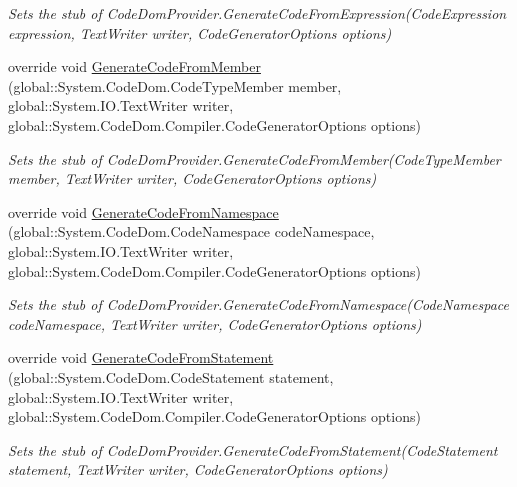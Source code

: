 \begin{DoxyCompactItemize}
\begin{DoxyCompactList}\small\item\em Sets the stub of Code\-Dom\-Provider.\-Generate\-Code\-From\-Expression(\-Code\-Expression expression, Text\-Writer writer, Code\-Generator\-Options options)\end{DoxyCompactList}\item 
override void \hyperlink{class_system_1_1_code_dom_1_1_compiler_1_1_fakes_1_1_stub_code_dom_provider_ac41ee4606fae68006bb1d25f86498d2d}{Generate\-Code\-From\-Member} (global\-::\-System.\-Code\-Dom.\-Code\-Type\-Member member, global\-::\-System.\-I\-O.\-Text\-Writer writer, global\-::\-System.\-Code\-Dom.\-Compiler.\-Code\-Generator\-Options options)
\begin{DoxyCompactList}\small\item\em Sets the stub of Code\-Dom\-Provider.\-Generate\-Code\-From\-Member(\-Code\-Type\-Member member, Text\-Writer writer, Code\-Generator\-Options options)\end{DoxyCompactList}\item 
override void \hyperlink{class_system_1_1_code_dom_1_1_compiler_1_1_fakes_1_1_stub_code_dom_provider_ab511d0b52d5c026428ede97513233b2f}{Generate\-Code\-From\-Namespace} (global\-::\-System.\-Code\-Dom.\-Code\-Namespace code\-Namespace, global\-::\-System.\-I\-O.\-Text\-Writer writer, global\-::\-System.\-Code\-Dom.\-Compiler.\-Code\-Generator\-Options options)
\begin{DoxyCompactList}\small\item\em Sets the stub of Code\-Dom\-Provider.\-Generate\-Code\-From\-Namespace(\-Code\-Namespace code\-Namespace, Text\-Writer writer, Code\-Generator\-Options options)\end{DoxyCompactList}\item 
override void \hyperlink{class_system_1_1_code_dom_1_1_compiler_1_1_fakes_1_1_stub_code_dom_provider_a2199bef6efabac7451b7909a89e3b3c2}{Generate\-Code\-From\-Statement} (global\-::\-System.\-Code\-Dom.\-Code\-Statement statement, global\-::\-System.\-I\-O.\-Text\-Writer writer, global\-::\-System.\-Code\-Dom.\-Compiler.\-Code\-Generator\-Options options)
\begin{DoxyCompactList}\small\item\em Sets the stub of Code\-Dom\-Provider.\-Generate\-Code\-From\-Statement(\-Code\-Statement statement, Text\-Writer writer, Code\-Generator\-Options options)\end{DoxyCompactList}\item 

\end{DoxyCompactItemize}
